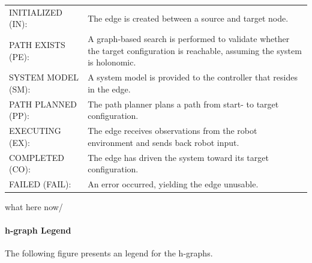 \noindent
\begin{table}[H]
\centering
\begin{tabular}%
  {>{\raggedleft\arraybackslash}p{}%
   >{\raggedright\arraybackslash}p{}}
INITIALIZED (IN): & The edge is created between a source and target node.\\
PATH EXISTS (PE): & A graph-based search is performed to validate whether the target configuration is reachable, assuming the system is holonomic. \\
SYSTEM MODEL (SM): & A system model is provided to the controller that resides in the edge.\\
PATH PLANNED (PP): & The path planner plans a path from start- to target configuration. \\
EXECUTING (EX): & The edge receives observations from the robot environment and sends back robot input. \\
COMPLETED (CO): & The edge has driven the system toward its target configuration. \\
FAILED (FAIL): & An error occurred, yielding the edge unusable. \\
\end{tabular}
\end{table}

what here now/

\paragraph{\ac{h-graph} Legend}
The following figure presents an legend for the \ac{h-graph}s.\bs

